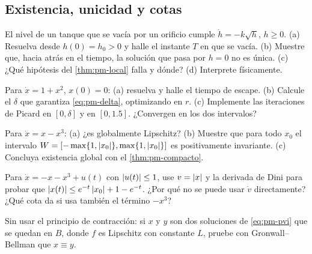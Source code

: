\subsection*{Existencia, unicidad y cotas}

\begin{problema}\label{prob:pm-torricelli}
El nivel de un tanque que se vacía por un orificio cumple $\dot h=-k\sqrt h$, $h\ge0$. (a) Resuelva desde $h(0)=h_0>0$ y halle el instante $T$ en que se vacía. (b) Muestre que, hacia atrás en el tiempo, la solución que pasa por $h=0$ no es única. (c) ¿Qué hipótesis del \cref{thm:pm-local} falla y dónde? (d) Interprete físicamente.
\end{problema}

\begin{problema}[escape en $\pi/2$]\label{prob:pm-tan}
Para $\dot x=1+x^2$, $x(0)=0$: (a) resuelva y halle el tiempo de escape. (b) Calcule el $\delta$ que garantiza \eqref{eq:pm-delta}, optimizando en $r$. (c) \etiquetaM{} Implemente las iteraciones de Picard en $[0,\delta]$ y en $[0,1.5]$. ¿Convergen en los dos intervalos?
\end{problema}

\begin{problema}\label{prob:pm-compacto}
Para $\dot x=x-x^3$: (a) ¿es globalmente Lipschitz? (b) Muestre que para todo $x_0$ el intervalo $W=[-\max\{1,\left\lvert x_0\right\rvert\},\max\{1,\left\lvert x_0\right\rvert\}]$ es positivamente invariante. (c) Concluya existencia global con el \cref{thm:pm-compacto}.
\end{problema}

\begin{problema}\label{prob:pm-entrada}
Para $\dot x=-x-x^3+u(t)$ con $\left\lvert u(t)\right\rvert\le1$, use $v=\left\lvert x\right\rvert$ y la derivada de Dini para probar que $\left\lvert x(t)\right\rvert\le e^{-t}\left\lvert x_0\right\rvert+1-e^{-t}$. ¿Por qué no se puede usar $\dot v$ directamente? ¿Qué cota da si usa también el término $-x^3$? \etiquetaEstrella{}
\end{problema}

\begin{problema}\label{prob:pm-unicidadGB}
\etiquetaEstrella{} Sin usar el principio de contracción: si $x$ y $y$ son dos soluciones de \eqref{eq:pm-pvi} que se quedan en $B$, donde $f$ es Lipschitz con constante $L$, pruebe con Gronwall--Bellman que $x\equiv y$.
\end{problema}

